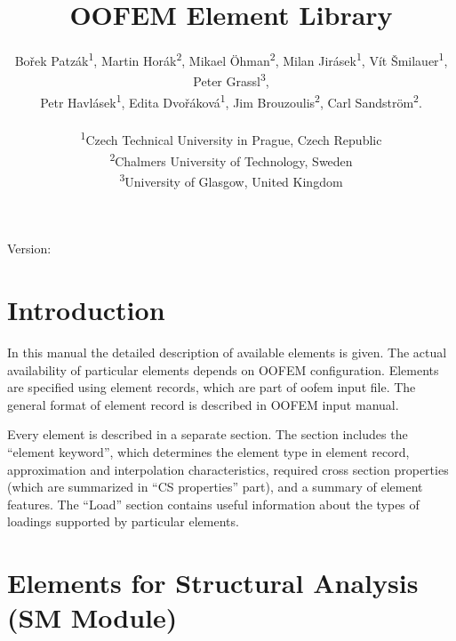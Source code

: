 \documentclass[a4paper]{article}
\begin{document}
\title{OOFEM Element Library}
\author{
  Bořek Patzák\textsuperscript{1},
  Martin Horák\textsuperscript{2},
  Mikael Öhman\textsuperscript{2},
  Milan Jirásek\textsuperscript{1},
  Vít Šmilauer\textsuperscript{1},
  Peter Grassl\textsuperscript{3},\\
  Petr Havlásek\textsuperscript{1},
  Edita Dvořáková\textsuperscript{1},
  Jim Brouzoulis\textsuperscript{2},
  Carl Sandström\textsuperscript{2}.\\ \\
  \textsuperscript{1}Czech Technical University in Prague, Czech Republic\\
  \textsuperscript{2}Chalmers University of Technology, Sweden\\
  \textsuperscript{3}University of Glasgow, United Kingdom 
}

\maketitle
\begin{center}
  Version: \version
\end{center}

\newpage
\tableofcontents
\newpage
\listoffigures

\section{Introduction}
In this manual the detailed description of available elements 
is given. The actual availability of particular elements depends on
OOFEM configuration. Elements are specified using element records,
which are part of oofem input file. The general format of element
record is described in OOFEM input manual. 

Every element is described in a separate section. The section includes the ``element keyword'', which
determines the element type in element record, approximation and
interpolation characteristics, required cross section properties
(which are summarized in ``CS properties'' part), and a summary of
element features. The ``Load'' section contains useful
information about the types of loadings supported by particular elements.



\section{Elements for Structural Analysis (SM Module)}
\end{document}
